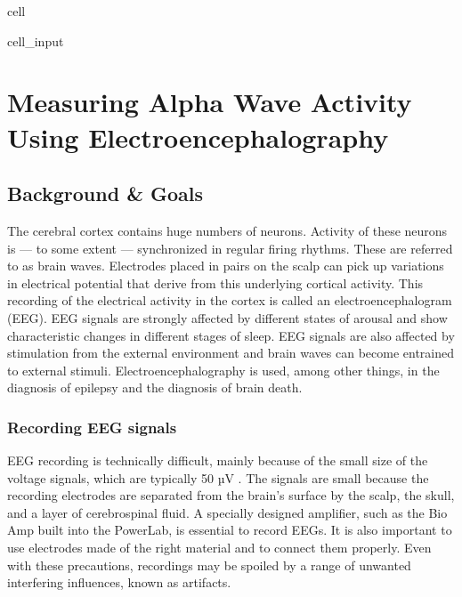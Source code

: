 \documentclass[letterpaper,10pt,english]{jupyterBook}
\begin{document}
\begin{sphinxuseclass}{cell}
\begin{sphinxVerbatimInput}
\begin{sphinxuseclass}{cell_input}
\end{sphinxuseclass}\end{sphinxVerbatimInput}

\end{sphinxuseclass}
\sphinxstepscope


\chapter{Measuring Alpha Wave Activity Using Electroencephalography}
\label{\detokenize{EEG:measuring-alpha-wave-activity-using-electroencephalography}}\label{\detokenize{EEG::doc}}

\section{Background \& Goals}
\label{\detokenize{EEG:background-goals}}
\sphinxAtStartPar
The cerebral cortex contains huge numbers of neurons. Activity of these neurons is — to some extent — synchronized in regular firing rhythms. These are referred to as brain waves. Electrodes placed in pairs on the scalp can pick up variations in electrical potential that derive from this underlying cortical activity. This recording of the electrical activity in the cortex is called an electroencephalogram (EEG). EEG signals are strongly affected by different states of arousal and show characteristic changes in different stages of sleep. EEG signals are also affected by stimulation from the external environment and brain waves can become entrained to external stimuli. Electroencephalography is used, among other things, in the diagnosis of epilepsy and the diagnosis of brain death.


\subsection{Recording EEG signals}
\label{\detokenize{EEG:recording-eeg-signals}}
\sphinxAtStartPar
EEG recording is technically difficult, mainly because of the small size of the voltage signals, which are typically 50 µV . The signals are small because the recording electrodes are separated from the brain’s surface by the scalp, the skull, and a layer of cerebrospinal fluid. A specially designed amplifier, such as the Bio Amp built into the PowerLab, is essential to record EEGs. It is also important to use electrodes made of the right material and to connect them properly. Even with these precautions, recordings may be spoiled by a range of unwanted interfering influences, known as artifacts.
\end{document}
